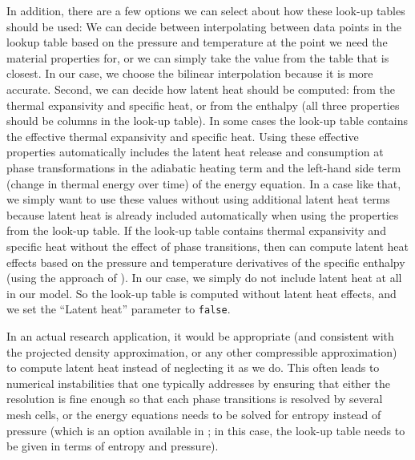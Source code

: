 In addition, there are a few options we can select about how these look-up tables should be used:
We can decide between interpolating between data points in the lookup table based on the pressure and temperature at the point we need the material properties for, or we can simply take the value from the table that is closest. In our case, we choose the bilinear interpolation because it is more accurate. 
Second, we can decide how latent heat should be computed: from the thermal expansivity and specific heat, 
or from the enthalpy (all three properties should be columns in the look-up table). 
In some cases the look-up table contains the effective thermal expansivity and specific heat. Using these effective properties automatically includes the latent heat release and consumption at phase transformations in the adiabatic heating term and the left-hand side term (change in thermal energy over time) of the energy equation. In a case like that, we simply want to use these values without using additional latent heat terms because latent heat is already included automatically when using the properties from the look-up table. 
If the look-up table contains thermal expansivity and specific heat without the effect of phase transitions, then \aspect{} can compute latent heat effects based on the pressure and 
temperature derivatives of the specific enthalpy (using the approach of \cite{nakagawa2009incorporating}).
In our case, we simply do not include latent heat at all in our model.
So the look-up table is computed without latent heat effects, and we set the ``Latent heat'' parameter to \texttt{false}.

In an actual research application, it would be appropriate (and consistent with the projected density approximation, or any other compressible approximation) to compute latent heat instead of neglecting it as we do. This often leads to numerical instabilities that one typically addresses by ensuring that either the resolution is fine enough so that each phase transitions is resolved by several mesh cells,
or the energy equations needs to be solved for entropy instead of pressure (which is an option available in \aspect{}; in this case, the look-up table needs to be given in terms of entropy and pressure). 

